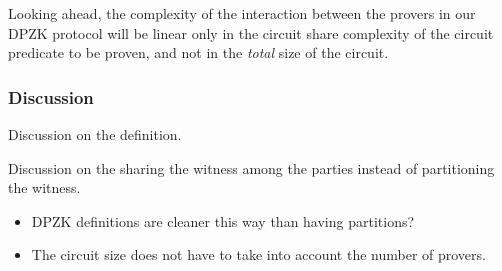 Looking ahead, the complexity of the interaction between the provers in our DPZK protocol will be linear only in the circuit share complexity of the circuit predicate to be proven, and not in the \textit{total} size of the circuit. 
 
\subsubsection{Discussion}
Discussion on the definition.

Discussion on the sharing the witness among the parties instead of partitioning the witness.
\begin{itemize}
\item DPZK definitions are cleaner this way than having partitions?
\item The circuit size does not have to take into account the number of provers.
\end{itemize}

%
%
